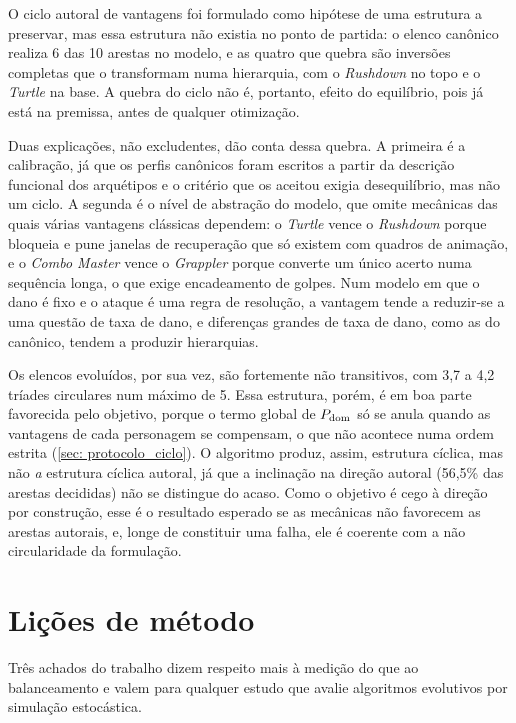 O ciclo autoral de vantagens foi formulado como hipótese de uma estrutura a preservar, mas essa estrutura não existia no ponto de partida: o elenco canônico realiza 6 das 10 arestas no modelo, e as quatro que quebra são inversões completas que o transformam numa hierarquia, com o \textit{Rushdown} no topo e o \textit{Turtle} na base. A quebra do ciclo não é, portanto, efeito do equilíbrio, pois já está na premissa, antes de qualquer otimização.

Duas explicações, não excludentes, dão conta dessa quebra. A primeira é a calibração, já que os perfis canônicos foram escritos a partir da descrição funcional dos arquétipos e o critério que os aceitou exigia desequilíbrio, mas não um ciclo. A segunda é o nível de abstração do modelo, que omite mecânicas das quais várias vantagens clássicas dependem: o \textit{Turtle} vence o \textit{Rushdown} porque bloqueia e pune janelas de recuperação que só existem com quadros de animação, e o \textit{Combo Master} vence o \textit{Grappler} porque converte um único acerto numa sequência longa, o que exige encadeamento de golpes. Num modelo em que o dano é fixo e o ataque é uma regra de resolução, a vantagem tende a reduzir-se a uma questão de taxa de dano, e diferenças grandes de taxa de dano, como as do canônico, tendem a produzir hierarquias.

Os elencos evoluídos, por sua vez, são fortemente não transitivos, com 3,7 a 4,2 tríades circulares num máximo de 5. Essa estrutura, porém, é em boa parte favorecida pelo objetivo, porque o termo global de $P_{\mathrm{dom}}$ só se anula quando as vantagens de cada personagem se compensam, o que não acontece numa ordem estrita (\autoref{sec: protocolo_ciclo}). O algoritmo produz, assim, estrutura cíclica, mas não \textit{a} estrutura cíclica autoral, já que a inclinação na direção autoral (56,5\% das arestas decididas) não se distingue do acaso. Como o objetivo é cego à direção por construção, esse é o resultado esperado se as mecânicas não favorecem as arestas autorais, e, longe de constituir uma falha, ele é coerente com a não circularidade da formulação.

\section{Lições de método}
\label{sec: disc_medicao}

Três achados do trabalho dizem respeito mais à medição do que ao balanceamento e valem para qualquer estudo que avalie algoritmos evolutivos por simulação estocástica.

